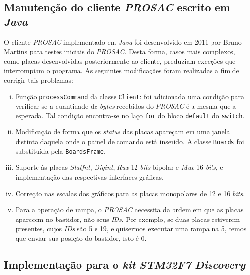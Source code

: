  
\subsection {Manutenção do cliente \textit{PROSAC} escrito em \textit{Java}}

O cliente \textit{PROSAC} implementado em \textit{Java} foi desenvolvido em 2011
por Bruno Martins para testes iniciais do \textit{PROSAC}. Desta forma, casos mais
complexos, como placas desenvolvidas posteriormente ao cliente, produziam
exceções que interrompiam o programa. As seguintes modificações foram realizadas
a fim de corrigir tais problemas:

\begin {enumerate} [i.] 
  \item Função \texttt{processCommand} da classe \texttt{Client}: foi adicionada
  uma condição para verificar se a quantidade de \textit{bytes} recebidos do
  \textit{PROSAC} é a mesma que a esperada. Tal condição encontra-se no laço
  \texttt{for} do bloco \texttt{default} do \texttt{switch}.

  \item Modificação de forma que os \textit{status} das placas apareçam em uma
  janela distinta daquela onde o painel de comando está inserido. A classe
  \texttt{Boards} foi substituída pela \texttt{BoardsFrame}.
  
  \item Suporte às placas \textit{Statfnt}, \textit{Digint}, \textit{Rux} 12
  \textit{bits} bipolar e \textit{Mux} 16 \textit{bits}, e implementação das
  respectivas interfaces gráficas.

  \item Correção nas escalas dos gráficos para as placas monopolares de 12 e 16
  \textit{bits}.
  
  \item Para a operação de rampa, o \textit{PROSAC} necessita da ordem em que
  as placas aparecem no bastidor, não seus \textit{IDs}. Por exemplo, se duas
  placas estiverem presentes, cujos \textit{IDs} são 5 e 19, e quisermos
  executar uma rampa na 5, temos que enviar sua posição do bastidor, isto é 0.

\end{enumerate}

\subsection {Implementação para o \textit{kit} \textit{STM32F7 Discovery}}

